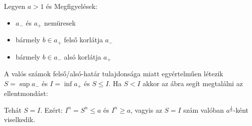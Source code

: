 Legyen $a>1$ és
Megfigyelések:
\begin{itemize}
   \item $a_{-}$ és $a_{+}$ nemüresek
   \item bármely $b\in a_{+}$ felső korlátja $a_{-}$
   \item bármely $b\in a_{-}$ alsó korlátja $a_{+}$
\end{itemize}
A valós számok felső/alsó-határ tulajdonsága miatt egyértelműen létezik
$S=\sup a_{-}$ és $I=\inf a_{+}$ és $S\le I.$
Ha $S < I$ akkor az ábra segít megtalálni az ellentmondást:
\begin{center}
\end{center}
Tehát $S=I.$ Ezért: $I^n = S^n \le a$ és $I^n\ge a$, vagyis az $S=I$ szám
valóban $a^{\frac{1}{n}}$-ként viselkedik.

